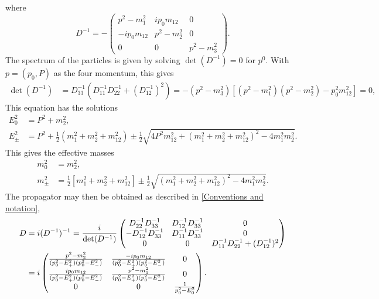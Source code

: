 where
\begin{equation*}
    D^{-1} = -
    \begin{pmatrix}
        p^2 - m^2_1             & i p_0 m_{12}     & 0             \\
        - i p_0 m_{12}            & p^2 - m^2_2       & 0             \\
        0                       & 0                 & p^2 - m^2_3
    \end{pmatrix}.
\end{equation*}
The spectrum of the particles is given by solving $\det(D^{-1}) = 0$ for $p^0$. With $p = (p_0, P)$ as the four momentum, this gives
\begin{align*}
    \det(D^{-1}) & = D^{-1}_{33} \left(D^{-1}_{11} D^{-1}_{22} + (D^{-1}_{12})^2\right)
    = - \left(p^2 - m^2_3\right)
    \left[
        \left(p^2 - m^2_1\right)
        \left(p^2 - m^2_2\right)
        - p_0^2 m_{12}^2
    \right] = 0,
\end{align*}
This equation has the solutions
\begin{align}
    E_0^2 &= P^2 + m_2^2, \\
    E_\pm^2
    & = P^2 +
    \frac{1}{2}
    \left(
        m_1^2 + m_2^2 + m_{12}^2 
    \right)
    \pm 
    \frac{1}{2}
    \sqrt{
        4P^2m_{12}^2 
        +
        \left(
            m_1^2 + m_2^2 + m_{12}^2
        \right)^2
        - 4 m_1^2 m_2^2
    }.
\end{align}
This gives the effective masses
\begin{align}
    m_0^2 &= m_2^2, \\
    m_\pm^2
    & =  \frac{1}{2}
    \left[
        m_1^2 + m_2^2 + m_{12}^2 
    \right]
    \pm \frac{1}{2}
    \sqrt{
        \left(
            m_1^2 + m_2^2 + m_{12}^2
        \right)^2
        - 4 m_1^2 m_2^2
    }.
\end{align}
The propagator may then be obtained as described in \autoref{Conventions and notation},
\begin{align}
    \notag
    D & = i (D^{-1})^{-1} = \frac{i}{\det(D^{-1})}
    \begin{pmatrix}
        D^{-1}_{22} D^{-1}_{33}   & D^{-1}_{12}D^{-1}_{33}  & 0 \\
        -D^{-1}_{12}D^{-1}_{33}   & D^{-1}_{11}D^{-1}_{33}  & 0 \\
        0               & 0             & D^{-1}_{11}D^{-1}_{22} + (D^{-1}_{12})^2
    \end{pmatrix} \\
    \label{free pion propagator}
    & = i
    \begin{pmatrix}
        \frac{
            p^2 - m_2^2
        }
        {
            (p_0^2 - E_+^2)(p_0^2 - E_-^2)
        } 
        & \frac{
            - ip_0m_{12}
        }
        {
            (p_0^2 - E_+^2)(p_0^2 - E_-^2)
        } & 0 \\
        \frac{
            ip_0m_{12}
        }
        {
            (p_0^2 - E_+^2)(p_0^2 - E_-^2)
        }
        & \frac{
            p^2 - m_1^2
        }
        {
            (p_0^2 - E_+^2)(p_0^2 - E_-^2)
        } & 0 \\
        0 & 0 & 
        \frac{1}{p_0^2 - E_0^2}
    \end{pmatrix}.
\end{align}
